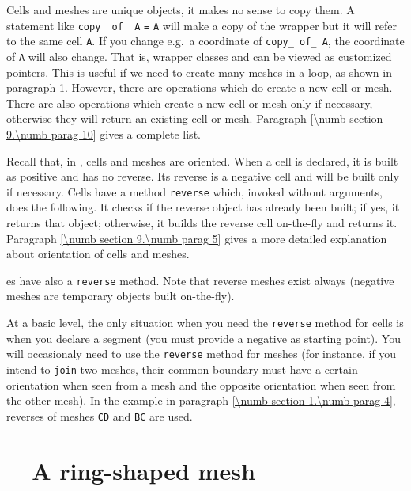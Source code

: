 Cells and meshes are unique objects, it makes no sense to copy them.
A statement like {\small\tt {}} {\small\tt copy\_\,of\_\,A} {\small\tt =} {\small\tt A}
will make a copy of the wrapper but it will refer to the same cell {\small\tt A}.
If you change e.g.\ a coordinate of {\small\tt copy\_\,of\_\,A}, the coordinate of {\small\tt A}
will also change.
That is, wrapper classes {\small\tt {}} and {\small\tt {}} can be viewed as
customized pointers.
This is useful if we need to create many meshes in a loop, as shown in paragraph
\ref{\numb section 9.\numb parag 2}.
However, there are operations which do create a new cell or mesh.
There are also operations which create a new cell or mesh only if necessary,
otherwise they will return an existing cell or mesh.
Paragraph \ref{\numb section 9.\numb parag 10} gives a complete list.

Recall that, in \maniFEM, cells and meshes are oriented.
When a cell is declared, it is built as positive and has no reverse.
Its reverse is a negative cell and will be built only if necessary.
Cells have a method {\small\tt reverse} which, invoked without arguments, does the following.
It checks if the reverse object has already been built; if yes, it returns that object;
otherwise, it builds the reverse cell on-the-fly and returns it.
Paragraph \ref{\numb section 9.\numb parag 5} gives a more detailed explanation about
orientation of cells and meshes.

{\small\tt {}}es have also a {\small\tt reverse} method.
Note that reverse meshes exist always (negative meshes are temporary objects built
on-the-fly).

At a basic level, the only situation when you need the {\small\tt reverse} method  for cells is
when you declare a segment {\small\tt {}} (you must provide a negative
{\small\tt {}} as starting point).
You will occasionaly need to use the {\small\tt reverse} method for meshes (for instance, if you
intend to {\small\tt join} two meshes, their common boundary must have a certain orientation when
seen from a mesh and the opposite orientation when seen from the other mesh).
In the example in paragraph \ref{\numb section 1.\numb parag 4},
reverses of meshes {\small\tt CD} and {\small\tt BC} are used.


\section{~~A ring-shaped mesh}\label{\numb section 9.\numb parag 2}

